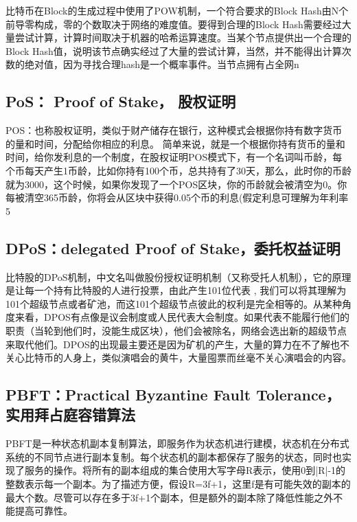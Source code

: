 \documentclass[UTF8]{ctexart}
\begin{document}
比特币在Block的生成过程中使用了POW机制，一个符合要求的Block Hash由N个前导零构成，零的个数取决于网络的难度值。要得到合理的Block Hash需要经过大量尝试计算，计算时间取决于机器的哈希运算速度。当某个节点提供出一个合理的Block Hash值，说明该节点确实经过了大量的尝试计算，当然，并不能得出计算次数的绝对值，因为寻找合理hash是一个概率事件。当节点拥有占全网n%

\subsection{PoS： Proof of Stake， 股权证明}

POS：也称股权证明，类似于财产储存在银行，这种模式会根据你持有数字货币的量和时间，分配给你相应的利息。 
简单来说，就是一个根据你持有货币的量和时间，给你发利息的一个制度，在股权证明POS模式下，有一个名词叫币龄，每个币每天产生1币龄，比如你持有100个币，总共持有了30天，那么，此时你的币龄就为3000，这个时候，如果你发现了一个POS区块，你的币龄就会被清空为0。你每被清空365币龄，你将会从区块中获得0.05个币的利息(假定利息可理解为年利率5%

\subsection{DPoS：delegated Proof of Stake，委托权益证明}

比特股的DPoS机制，中文名叫做股份授权证明机制（又称受托人机制），它的原理是让每一个持有比特股的人进行投票，由此产生101位代表 , 我们可以将其理解为101个超级节点或者矿池，而这101个超级节点彼此的权利是完全相等的。从某种角度来看，DPOS有点像是议会制度或人民代表大会制度。如果代表不能履行他们的职责（当轮到他们时，没能生成区块），他们会被除名，网络会选出新的超级节点来取代他们。DPOS的出现最主要还是因为矿机的产生，大量的算力在不了解也不关心比特币的人身上，类似演唱会的黄牛，大量囤票而丝毫不关心演唱会的内容。

\subsection{PBFT：Practical Byzantine Fault Tolerance，实用拜占庭容错算法}

PBFT是一种状态机副本复制算法，即服务作为状态机进行建模，状态机在分布式系统的不同节点进行副本复制。每个状态机的副本都保存了服务的状态，同时也实现了服务的操作。将所有的副本组成的集合使用大写字母R表示，使用0到|R|-1的整数表示每一个副本。为了描述方便，假设R=3f+1，这里f是有可能失效的副本的最大个数。尽管可以存在多于3f+1个副本，但是额外的副本除了降低性能之外不能提高可靠性。
\end{document}
